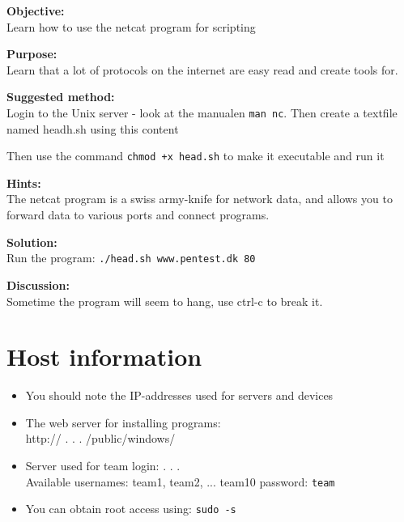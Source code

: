 \documentclass[a4paper,11pt,notitlepage]{report}
\begin{document}
{\bf Objective:} \\
Learn how to use the netcat program for scripting

{\bf Purpose:}\\
Learn that a lot of protocols on the internet are easy read and create tools for.

{\bf Suggested method:} \\
Login to the Unix server - look at the manualen \verb+man nc+.
Then create a textfile named headh.sh using this content
\begin{alltt}

\end{alltt}

Then use the command \verb#chmod +x head.sh# to make it executable and run it

{\bf Hints:}\\
The netcat program is a swiss army-knife for network data, and allows you to forward data to various ports and connect programs.

{\bf Solution:}\\
Run the program: \verb+./head.sh www.pentest.dk 80+


{\bf Discussion:}\\

Sometime the program will seem to hang, use ctrl-c to break it.


\appendix
\rhead{\fancyplain{}{\bf \leftmark}}

\normal

\chapter{\color{titlecolor}Host information}

\begin{itemize}
\item You should note the IP-addresses used for servers and devices
\item The web server for installing programs:\\
http:// \hskip 15mm .\hskip 15mm .\hskip 15mm .\hskip 15mm
/public/windows/
\item Server used for team login: \hskip 15mm .\hskip 15mm .\hskip 15mm .\hskip 15mm \\
Available usernames: team1, team2, ... team10
password: \verb+team+
\item You can obtain root access using: \verb+sudo -s+
\end{itemize}
\end{document}
